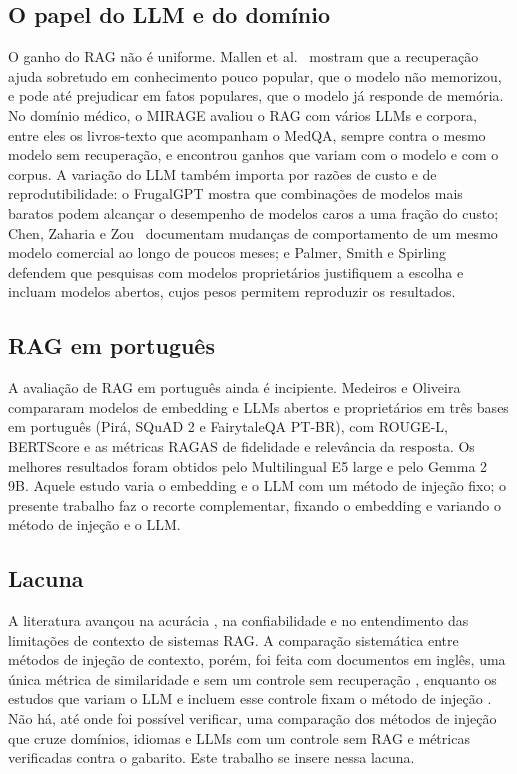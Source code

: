 \subsection{O papel do LLM e do domínio}

O ganho do RAG não é uniforme. Mallen et al.~\cite{mallen2023trust} mostram que a recuperação ajuda sobretudo em conhecimento pouco popular, que o modelo não memorizou, e pode até prejudicar em fatos populares, que o modelo já responde de memória. No domínio médico, o MIRAGE \cite{xiong2024mirage} avaliou o RAG com vários LLMs e corpora, entre eles os livros-texto que acompanham o MedQA, sempre contra o mesmo modelo sem recuperação, e encontrou ganhos que variam com o modelo e com o corpus. A variação do LLM também importa por razões de custo e de reprodutibilidade: o FrugalGPT \cite{chen2023frugalgpt} mostra que combinações de modelos mais baratos podem alcançar o desempenho de modelos caros a uma fração do custo; Chen, Zaharia e Zou~\cite{chen2024chatgptbehavior} documentam mudanças de comportamento de um mesmo modelo comercial ao longo de poucos meses; e Palmer, Smith e Spirling~\cite{palmer2024proprietary} defendem que pesquisas com modelos proprietários justifiquem a escolha e incluam modelos abertos, cujos pesos permitem reproduzir os resultados.

\subsection{RAG em português}

A avaliação de RAG em português ainda é incipiente. Medeiros e Oliveira~\cite{medeiros2025embeddings} compararam modelos de embedding e LLMs abertos e proprietários em três bases em português (Pirá, SQuAD 2 e FairytaleQA PT-BR), com ROUGE-L, BERTScore e as métricas RAGAS de fidelidade e relevância da resposta. Os melhores resultados foram obtidos pelo Multilingual E5 large e pelo Gemma 2 9B. Aquele estudo varia o embedding e o LLM com um método de injeção fixo; o presente trabalho faz o recorte complementar, fixando o embedding e variando o método de injeção e o LLM.

\subsection{Lacuna}

A literatura avançou na acurácia \cite{ma2023query, rackauckas2024ragfusion}, na confiabilidade \cite{andriopoulos2023augmenting, barnett2024seven} e no entendimento das limitações de contexto \cite{liu2023lost, nair2023drilling} de sistemas RAG. A comparação sistemática entre métodos de injeção de contexto, porém, foi feita com documentos em inglês, uma única métrica de similaridade e sem um controle sem recuperação \cite{sakar2025rag}, enquanto os estudos que variam o LLM e incluem esse controle fixam o método de injeção \cite{xiong2024mirage, medeiros2025embeddings}. Não há, até onde foi possível verificar, uma comparação dos métodos de injeção que cruze domínios, idiomas e LLMs com um controle sem RAG e métricas verificadas contra o gabarito. Este trabalho se insere nessa lacuna.
